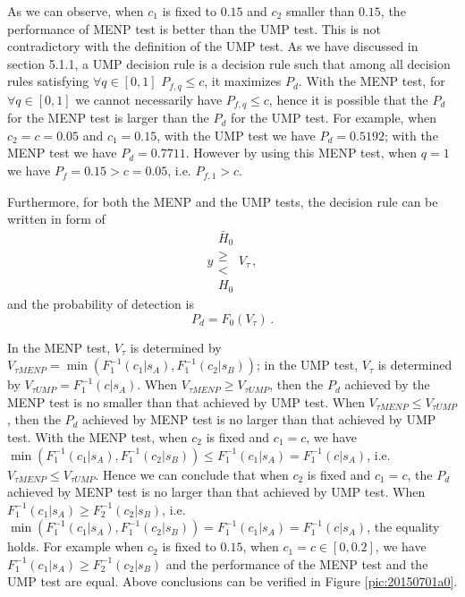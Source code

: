 As we can observe, when $c_1$ is fixed to $0.15$ and $c_2$ smaller than $0.15$, the performance of MENP test is better than the UMP test. This is not contradictory with the definition of the UMP test. As we have discussed in section 5.1.1, a UMP decision rule is a decision rule such that among all decision rules satisfying $\forall q \in [0, 1]$ $P_{f,q} \leq c$, it maximizes $P_d$. With the MENP test, for $\forall q \in [0, 1]$ we cannot necessarily have $P_{f,q} \leq c$, hence it is possible that the $P_d$ for the MENP test is larger than the $P_d$ for the UMP test.  For example, when $c_2 = c = 0.05$ and $c_1 = 0.15$, with the UMP test we have $P_d = 0.5192$; with the MENP test we have $P_d = 0.7711$. However by using this MENP test, when $q = 1$ we have $P_f = 0.15 > c = 0.05$, i.e. $P_{f,1} > c$.   

Furthermore, for both the MENP and the UMP tests, the decision rule can be written in form of
\begin{equation}
  y \substack{\bar{H}_0\\ \geq\\ < \\ H_0 } V_\tau\,,
  \label{20150701a4}
\end{equation}
and the probability of detection is 
\begin{equation}
  P_d = F_0(V_\tau)\,.
  \label{20150701a5}
\end{equation}

In the MENP test, $V_\tau$ is determined by $V_{\tau MENP}= \min (F_1^{-1}(c_1|s_A), F_1^{-1}(c_2|s_B))$; in the UMP test, $V_\tau$ is determined by $V_{\tau UMP} = F_1^{-1}(c|s_A)$. When $V_{\tau MENP}  \geq V_{\tau UMP}$, then the $P_d$ achieved by the MENP test is no smaller than that achieved by UMP test. When $V_{\tau MENP}  \leq V_{\tau UMP}$, then the $P_d$ achieved by MENP test is no larger than that achieved by UMP test. 
With the MENP test, when $c_2$ is fixed and $c_1 = c$, we have $\min (F_1^{-1}(c_1|s_A), F_1^{-1}(c_2|s_B)) \leq F_1^{-1}(c_1|s_A) = F_1^{-1}(c|s_A) $, i.e. 
$V_{\tau MENP} \leq V_{\tau UMP}$.
Hence we can conclude that when $c_2$ is fixed and $c_1 = c$, the $P_d$ achieved by MENP test is no larger than that achieved by UMP test. When $F_1^{-1}(c_1|s_A) \geq F_2^{-1}(c_2|s_B)$, i.e. $\min (F_1^{-1}(c_1|s_A), F_1^{-1}(c_2|s_B)) = F_1^{-1}(c_1|s_A) = F_1^{-1}(c|s_A) $, the equality holds.  For example when $c_2 $ is fixed to $0.15$, when $c_1 = c \in [0, 0.2]$, we have $F_1^{-1}(c_1|s_A) \geq F_2^{-1}(c_2|s_B)$ and the performance of the MENP test and the UMP test are equal. 
Above conclusions can be verified in Figure \ref{pic:20150701a0}. 

